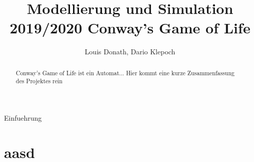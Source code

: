 \documentclass[runningheads]{llncs}
\begin{document}
%
\title{Modellierung und Simulation 2019/2020 Conway's Game of Life}
\author{Louis Donath, Dario Klepoch}
%
\authorrunning{}


\maketitle              

\begin{abstract}
Conway's Game of Life ist ein Automat...
Hier kommt eine kurze Zusammenfassung des Projektes rein
\end{abstract}
%

\begin{section}{Einfuehrung}
\end{section}

\section{aasd}
    
\end{document}
